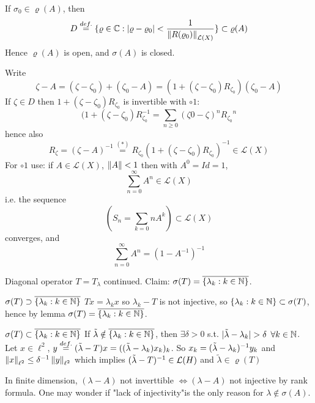 \begin{lemma}\nl
If $\sigma_0\in\varrho(A)$, then 
$$D\stackrel{def.}{=}
\{
\varrho\in\mathbb{C}:|\varrho-\varrho_0|<\frac{1}{\left\|{R(\varrho_0)}\right\|_{\mathcal{L}(X)}}
\}
\subset\varrho(A)$$
Hence $\varrho(A)$ is open, and $\sigma(A)$ is closed.
\begin{pf}{}{}
Write 
$$
\zeta-A=
( \zeta-\zeta_0)+(\zeta_0-A)=(1+(\zeta-\zeta_0)R_{\zeta_0})(\zeta_0-A)
$$
If $\zeta\in D$ then $1+(\zeta-\zeta_0)R_{\zeta_0}$ is invertible with $\circ{1}$:
$$
(1+(\zeta-\zeta_0)R_{\zeta_0}^{-1}=\sum_{n\geq0}(\zeta0-\zeta)^n {R_{\zeta_0}}^n
$$
hence also
$$
R_\zeta=(\zeta-A)^{-1}\stackrel{(*)}{=}R_{\zeta_0}(1+(\zeta-\zeta_0)R_{\zeta_0})^{-1}\in\mathcal{L}(X)
$$
For $\circ{1}$ use: if $A\in\mathcal{L}(X)$, $\left\|{A}\right\|<1$ then with $A^0=Id=1$, 
$$
\sum_{n=0}^\infty A^n\in\mathcal{L}(X)
$$
i.e. the sequence
$$
\left(
S_n=\sum_{k=0}n A^k
\right)\subset\mathcal{L}(X)
$$
converges, and
$$
\sum_{n=0}^\infty A^n=(1-A^{-1})^{-1}
$$
\end{pf}
\end{lemma}

\begin{example}\nl
    Diagonal operator $T=T_\lambda$ continued. Claim: $\sigma(T)=\overline{\{\lambda_k:k\in\mathbb{N}\}}$.
    \begin{pf}{$\sigma(T)\supset\overline{\{\lambda_k:k\in\mathbb{N}\}}$}{}
    $Tx=\lambda_k x$ so $\lambda_k-T$ is not injective, so $\{\lambda_k:k\in\mathbb{N}\}\subset\sigma(T)$, hence by lemma $\sigma(T)=\overline{\{\lambda_k:k\in\mathbb{N}\}}$.
    \end{pf}

    \begin{pf}{$\sigma(T)\subset\overline{\{\lambda_k:k\in\mathbb{N}\}}$}{}
    If $\Tilde{\lambda}\notin\overline{\{\lambda_k:k\in\mathbb{N}\}}$, then $\exists\delta>0$ s.t. $|\Tilde{\lambda}-\lambda_k|>\delta$ $\forall k\in\mathbb{N}$. Let $x\in\ell^2$, $y\stackrel{def.}{=}(\Tilde{\lambda}-T)x=((\Tilde{\lambda}-\lambda_k)x_k)_k$. So $x_k=(\Tilde{\lambda}-\lambda_k)^{-1}y_k$ and $\left\|{x}\right\|_{\ell^2}\leq\delta^{-1}\left\|{y}\right\|_{\ell^2}$ which implies $(\Tilde{\lambda}-T)^{-1}\in\mathcal{L}(H)$ and $\tilde{\lambda}\in\varrho(T)$
    \end{pf}
\end{example}

\begin{remark}\nl
    In finite dimension, $(\lambda-A)$ not inverttible $\iff(\lambda-A)$ not injective by rank formula. One may wonder if "lack of injectivity"is the only reason for $\lambda\notin \sigma(A)$.
\end{remark}

